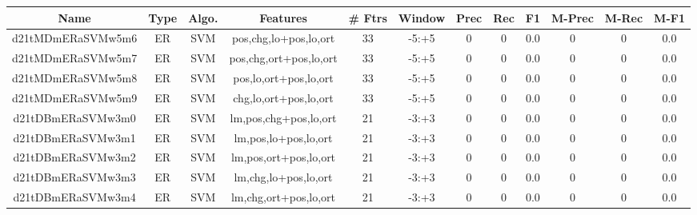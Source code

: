 \documentclass[a4paper]{article}
\begin{document}
\begin{landscape}
\begin{center}
\begin{tabular}{ |c|c|c|c|c|c|c|c|c|c|c|c|} 
 \hline
 	Name & Type & Algo. & Features & \# Ftrs & Window & Prec & Rec & F1 & M-Prec & M-Rec & M-F1\\
 \hline

 	

 
 	
 	\small{ d21tMDmERaSVMw5m6 } & ER & SVM & pos,chg,lo+pos,lo,ort  &  33 &  -5:+5  &  0 & 0 & 0.0  &  0 & 0 & 0.0 \\
 	

 
 	
 	\small{ d21tMDmERaSVMw5m7 } & ER & SVM & pos,chg,ort+pos,lo,ort  &  33 &  -5:+5  &  0 & 0 & 0.0  &  0 & 0 & 0.0 \\
 	

 
 	
 	\small{ d21tMDmERaSVMw5m8 } & ER & SVM & pos,lo,ort+pos,lo,ort  &  33 &  -5:+5  &  0 & 0 & 0.0  &  0 & 0 & 0.0 \\
 	

 
 	
 	\small{ d21tMDmERaSVMw5m9 } & ER & SVM & chg,lo,ort+pos,lo,ort  &  33 &  -5:+5  &  0 & 0 & 0.0  &  0 & 0 & 0.0 \\
 	

 
 	
 	\small{ d21tDBmERaSVMw3m0 } & ER & SVM & lm,pos,chg+pos,lo,ort  &  21 &  -3:+3  &  0 & 0 & 0.0  &  0 & 0 & 0.0 \\
 	

 
 	
 	\small{ d21tDBmERaSVMw3m1 } & ER & SVM & lm,pos,lo+pos,lo,ort  &  21 &  -3:+3  &  0 & 0 & 0.0  &  0 & 0 & 0.0 \\
 	

 
 	
 	\small{ d21tDBmERaSVMw3m2 } & ER & SVM & lm,pos,ort+pos,lo,ort  &  21 &  -3:+3  &  0 & 0 & 0.0  &  0 & 0 & 0.0 \\
 	

 
 	
 	\small{ d21tDBmERaSVMw3m3 } & ER & SVM & lm,chg,lo+pos,lo,ort  &  21 &  -3:+3  &  0 & 0 & 0.0  &  0 & 0 & 0.0 \\
 	

 
 	
 	\small{ d21tDBmERaSVMw3m4 } & ER & SVM & lm,chg,ort+pos,lo,ort  &  21 &  -3:+3  &  0 & 0 & 0.0  &  0 & 0 & 0.0 \\
 	


\end{tabular}
\end{center}
\end{landscape}
\end{document}
